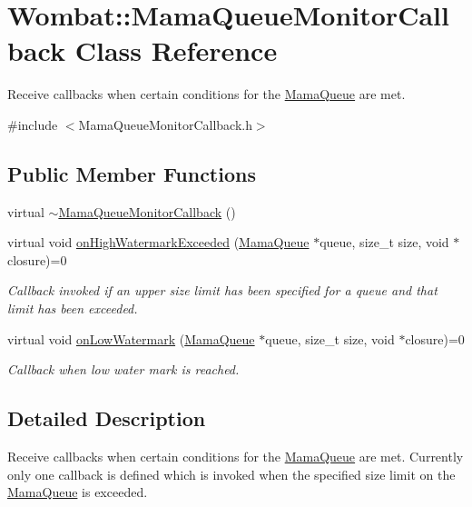 \hypertarget{classWombat_1_1MamaQueueMonitorCallback}{
\section{Wombat::MamaQueueMonitorCallback Class Reference}
\label{classWombat_1_1MamaQueueMonitorCallback}
}


Receive callbacks when certain conditions for the \hyperlink{classWombat_1_1MamaQueue}{MamaQueue} are met.  


{\ttfamily \#include $<$MamaQueueMonitorCallback.h$>$}\subsection*{Public Member Functions}
\begin{DoxyCompactItemize}
\item 
virtual \hyperlink{classWombat_1_1MamaQueueMonitorCallback_aef8c06407fa3cde05bbc52a21748b8c3}{$\sim$MamaQueueMonitorCallback} ()
\item 
virtual void \hyperlink{classWombat_1_1MamaQueueMonitorCallback_aed04cc6296cbd052724e2c390bc7c49c}{onHighWatermarkExceeded} (\hyperlink{classWombat_1_1MamaQueue}{MamaQueue} $\ast$queue, size\_\-t size, void $\ast$closure)=0
\begin{DoxyCompactList}\small\item\em Callback invoked if an upper size limit has been specified for a queue and that limit has been exceeded. \item\end{DoxyCompactList}\item 
virtual void \hyperlink{classWombat_1_1MamaQueueMonitorCallback_abcb11fd28083a7fa3165186111189321}{onLowWatermark} (\hyperlink{classWombat_1_1MamaQueue}{MamaQueue} $\ast$queue, size\_\-t size, void $\ast$closure)=0
\begin{DoxyCompactList}\small\item\em Callback when low water mark is reached. \item\end{DoxyCompactList}\end{DoxyCompactItemize}


\subsection{Detailed Description}
Receive callbacks when certain conditions for the \hyperlink{classWombat_1_1MamaQueue}{MamaQueue} are met. Currently only one callback is defined which is invoked when the specified size limit on the \hyperlink{classWombat_1_1MamaQueue}{MamaQueue} is exceeded. 

